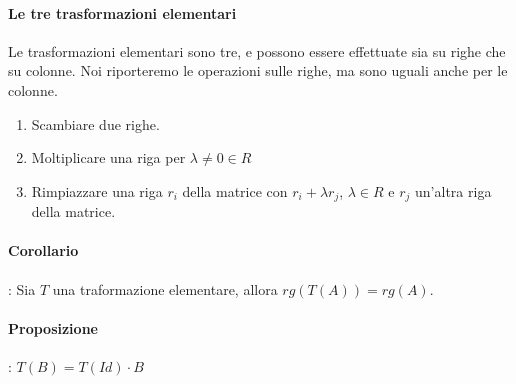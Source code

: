 \paragraph{Le tre trasformazioni elementari}
Le trasformazioni elementari sono tre, e possono essere effettuate sia su righe che su colonne. Noi riporteremo le operazioni sulle righe, ma sono uguali anche per le colonne.
\begin{enumerate}
	\item Scambiare due righe.
	\item Moltiplicare una riga per $\lambda \neq 0  \in R$
	\item Rimpiazzare una riga $r_i$ della matrice con $r_i + \lambda r_j$, $\lambda \in R$ e $r_j$ un'altra riga della matrice.
\end{enumerate}

\paragraph{Corollario}: Sia $T$ una traformazione elementare, allora $rg(T(A)) = rg(A)$.
\paragraph{Proposizione}: $T(B) = T(Id) \cdot B$


